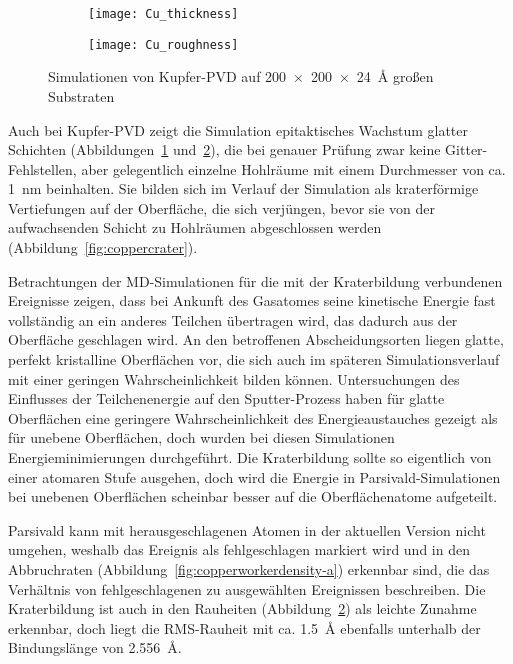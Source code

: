 \begin{figure}[b!]
  \captionsetup[subfigure]{singlelinecheck=false}
  \def\subfigwidth{0.49\textwidth}
  \begin{subfigure}[t]{\subfigwidth}
    \texttt{[image: Cu\_thickness]}
    \label{fig:copperparsivald-a}
  \end{subfigure}
  \hfill
  \begin{subfigure}[t]{\subfigwidth}
    \texttt{[image: Cu\_roughness]}
    \label{fig:copperparsivald-b}
  \end{subfigure}
  \caption{Simulationen von Kupfer-PVD auf \SI{200x200x24}{\angstrom} großen Substraten}
  \label{fig:copperparsivald}
\end{figure}

Auch bei Kupfer-PVD zeigt die Simulation epitaktisches Wachstum glatter Schichten (Abbildungen~\ref{fig:copperparsivald-a} und~\ref{fig:copperparsivald-b}), die bei genauer Prüfung zwar keine Gitter-Fehlstellen, aber gelegentlich einzelne Hohlräume mit einem Durchmesser von ca. \SI{1}{\nano\meter} beinhalten.
Sie bilden sich im Verlauf der Simulation als kraterförmige Vertiefungen auf der Oberfläche, die sich verjüngen, bevor sie von der aufwachsenden Schicht zu Hohlräumen abgeschlossen werden (Abbildung~\ref{fig:coppercrater}).

Betrachtungen der MD-Simulationen für die mit der Kraterbildung verbundenen Ereignisse zeigen, dass bei Ankunft des Gasatomes seine kinetische Energie fast vollständig an ein anderes Teilchen übertragen wird, das dadurch aus der Oberfläche geschlagen wird.
An den betroffenen Abscheidungsorten liegen glatte, perfekt kristalline Oberflächen vor, die sich auch im späteren Simulationsverlauf mit einer geringen Wahrscheinlichkeit bilden können.
Untersuchungen des Einflusses der Teilchenenergie auf den Sputter-Prozess\cite{zhou_atomistic_1998} haben für glatte Oberflächen eine geringere Wahrscheinlichkeit des Energieaustauches gezeigt als für unebene Oberflächen, doch wurden bei diesen Simulationen Energieminimierungen durchgeführt.
Die Kraterbildung sollte so eigentlich von einer atomaren Stufe ausgehen, doch wird die Energie in Parsivald-Simulationen bei unebenen Oberflächen scheinbar besser auf die Oberflächenatome aufgeteilt.

Parsivald kann mit herausgeschlagenen Atomen in der aktuellen Version nicht umgehen, weshalb das Ereignis als fehlgeschlagen markiert wird und in den Abbruchraten (Abbildung~\ref{fig:copperworkerdensity-a}) erkennbar sind, die das Verhältnis von fehlgeschlagenen zu ausgewählten Ereignissen beschreiben.
Die Kraterbildung ist auch in den Rauheiten (Abbildung~\ref{fig:copperparsivald-b}) als leichte Zunahme erkennbar, doch liegt die RMS-Rauheit mit ca. \SI{1.5}{\angstrom} ebenfalls unterhalb der Bindungslänge von \SI{2.556}{\angstrom}.

